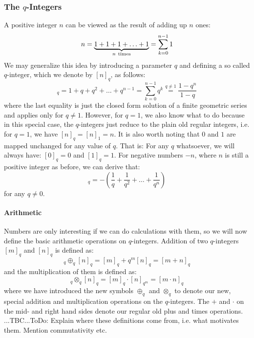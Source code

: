 \subsubsection{The $q$-Integers}
A positive integer $n$ can be viewed as the result of adding up $n$ ones:
\begin{equation}
n = \underbrace{1 + 1 + 1 + \ldots + 1}_{n\rm\ times} 
  = \sum_{k=0}^{n-1} 1
\end{equation}
We may generalize this idea by introducing a parameter $q$ and defining a so called $q$-integer, which we denote by $[n]_q$, as follows:
\begin{equation}
[n]_q = 1 + q + q^2 + \ldots + q^{n-1} 
      = \sum_{k=0}^{n-1} q^k
      \overset{q \neq 1}{=} \frac{1 - q^n}{1 - q}
\end{equation}
where the last equality is just the closed form solution of a finite geometric series and applies only for $q \neq 1$. However, for $q = 1$, we also know what to do because in this special case, the $q$-integers just reduce to the plain old regular integers, i.e. for $q=1$, we have $[n]_q = [n]_1 = n$. It is also worth noting that $0$ and $1$ are mapped unchanged for any value of $q$. That is: For any $q$ whatsoever, we will always have: $[0]_q = 0$ and $[1]_q = 1$. For negative numbers $-n$, where $n$ is still a positive integer as before, we can derive that:
\begin{equation}
[-n]_q = - \left( \frac{1}{q} + \frac{1}{q^2} + \ldots + \frac{1}{q^n}  \right)
\end{equation}
for any $q \neq 0$.

\paragraph{Arithmetic}
Numbers are only interesting if we can do calculations with them, so we will now define the basic arithmetic operations on $q$-integers. Addition of two $q$-integers $[m]_q$ and $[n]_q$ is defined as:
\begin{equation}
[m]_q \oplus_q [n]_q = [m]_q + q^m [n]_q = [m + n]_q
\end{equation}
and the multiplication of them is defined as:
\begin{equation}
[m]_q \otimes_q [n]_q = [m]_q \cdot [n]_{q^m} = [m \cdot n]_q
\end{equation}
where we have introduced the new symbols $\oplus_q$ and $\otimes_q$ to denote our new, special addition and multiplication operations on the $q$-integers. The $+$ and $\cdot$ on the mid- and right hand sides denote our regular old plus and times operations. ...TBC...ToDo: Explain where these definitions come from, i.e. what motivates them. Mention commutativity etc.

